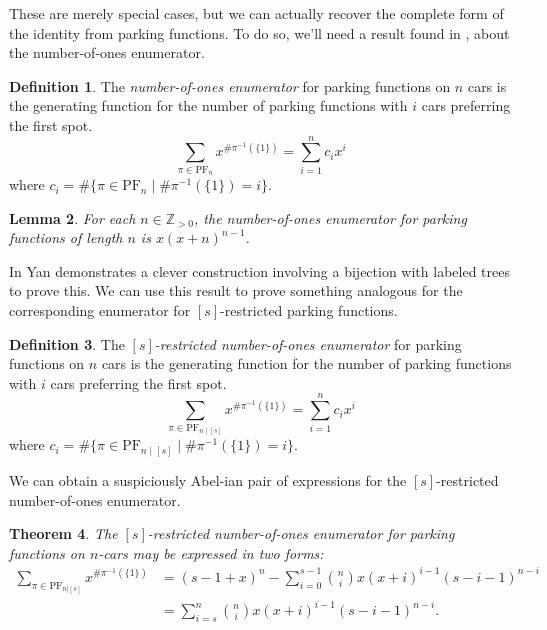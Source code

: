 \documentclass[12 pt]{amsart}
\newtheorem{theorem}{Theorem}
\newtheorem{lemma}[theorem]{Lemma}
\theoremstyle{definition} %
\newtheorem{definition}[theorem]{Definition}
\theoremstyle{remark} %
\begin{document}
These are merely special cases, but we can actually recover the complete form of the identity from parking functions. To do so, we'll need a result found in \cite{yan-survey-2015}, about the number-of-ones enumerator.

\begin{definition}
	The \emph{number-of-ones enumerator} for parking functions on $n$ cars is the generating function for the number of parking functions with $i$ cars preferring the first spot.
	\[
		\sum_{\pi \in \mathrm{PF}_{n}} x^{\# \pi^{-1}(\{ 1 \})} = \sum_{i = 1}^{n} c_{i} x^{i}
	\]
	where $c_{i} = \# \{ \pi \in \mathrm{PF}_{n} \mid \# \pi^{-1}(\{ 1 \}) = i \}$.
\end{definition}

\begin{lemma}
    For each $n\in\mathbb{Z}_{>0}$, the number-of-ones enumerator for parking functions of length $n$ is $x(x + n)^{n - 1}$.
\end{lemma}

In \cite{yan-survey-2015} Yan demonstrates a clever construction involving a bijection with labeled trees to prove this. We can use this result to prove something analogous for the corresponding enumerator for $[s]$-restricted parking functions. 

\begin{definition}
	The \emph{$[s]$-restricted number-of-ones enumerator} for parking functions on $n$ cars is the generating function for the number of parking functions with $i$ cars preferring the first spot.
	\[
		\sum_{\pi \in \mathrm{PF}_{n \mid [s]}} x^{\# \pi^{-1}(\{ 1 \})} = \sum_{i = 1}^{n} c_{i} x^{i}
	\]
	where $c_{i} = \# \{ \pi \in \mathrm{PF}_{n \mid [s]} \mid \# \pi^{-1}(\{ 1 \}) = i \}$.
\end{definition}

We can obtain a suspiciously Abel-ian pair of expressions for the $[s]$-restricted number-of-ones enumerator.

\begin{theorem}
    \label{thm:res-1s-enumerator}
    The $[s]$-restricted number-of-ones enumerator for parking functions on $n$-cars may be expressed in two forms:
    \begin{align*}
    \sum_{\pi\in\mathrm{PF}_{n|[s]}}x^{\# \pi^{-1}(\{1\})}&=(s-1+x)^{n} - \sum_{i = 0}^{s - 1} \binom{n}{i} x(x + i)^{i - 1} (s - i - 1)^{n - i}\\
    &=\sum_{i = s}^{n} \binom{n}{i} x(x + i)^{i - 1} (s - i - 1)^{n - i}.
    \end{align*}
\end{theorem}
\end{document}
